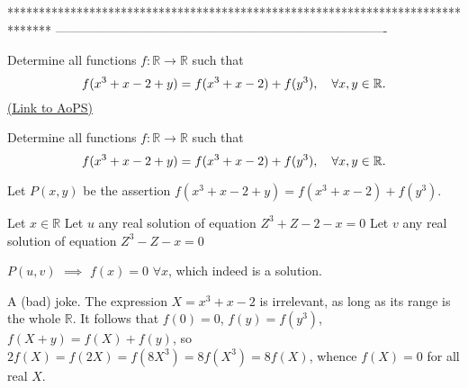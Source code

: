 *******************************************************************************
-------------------------------------------------------------------------------

\begin{problem}
	Determine all functions $f : \mathbb{R} \to \mathbb{R}$ such that \[ f(x^3+x-2+y)=f(x^3+x-2) + f(y^3), \ \ \ \forall x,y\in \Bbb{R}.\]
	\flushright \href{https://artofproblemsolving.com/community/c6h613065}{(Link to AoPS)}
\end{problem}



\begin{solution}
	\begin{tcolorbox}Determine all functions $f : \mathbb{R} \to \mathbb{R}$ such that \[ f(x^3+x-2+y)=f(x^3+x-2) + f(y^3), \ \ \ \forall x,y\in \Bbb{R}.\]\end{tcolorbox}
Let $P(x,y)$ be the assertion $f(x^3+x-2+y)=f(x^3+x-2)+f(y^3)$.

Let $x\in\mathbb R$
Let $u$ any real solution of equation $Z^3+Z-2-x=0$
Let $v$ any real solution of equation $Z^3-Z-x=0$

$P(u,v)$ $\implies$ $\boxed{f(x)=0}$ $\forall x$, which indeed is a solution.
\end{solution}



\begin{solution}
	A (bad) joke. The expression $X=x^3+x-2$ is irrelevant, as long as its range is the whole $\mathbb{R}$. It follows that $f(0)=0$, $f(y)=f(y^3)$, $f(X+y) = f(X)+f(y)$, so $2f(X) = f(2X) = f(8X^3) = 8f(X^3) = 8f(X)$, whence $f(X)=0$ for all real $X$.
\end{solution}



